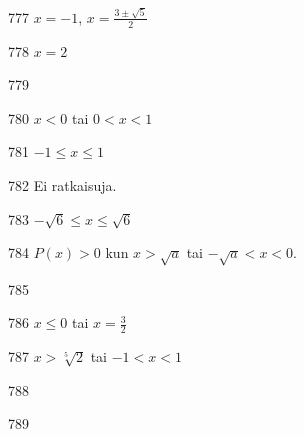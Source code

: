 \begin{Vastaus}{777}
		$x = -1$, $x = \frac{3\pm \sqrt{5}}{2}$
	
\end{Vastaus}
\begin{Vastaus}{778}
	$x=2$
	
\end{Vastaus}
\begin{Vastaus}{779}
    
\end{Vastaus}
\begin{Vastaus}{780}
        $x<0$ tai $0<x<1$
    
\end{Vastaus}
\begin{Vastaus}{781}
        $-1 \le x \le 1$
    
\end{Vastaus}
\begin{Vastaus}{782}
        Ei ratkaisuja.
    
\end{Vastaus}
\begin{Vastaus}{783}
        $-\sqrt{6}\le x \le \sqrt{6}$
    
\end{Vastaus}
\begin{Vastaus}{784}
	$P(x)>0$ kun $x > \sqrt{a}$ tai $-\sqrt{a}<x<0$.
    
\end{Vastaus}
\begin{Vastaus}{785}
    
\end{Vastaus}
\begin{Vastaus}{786}
        $x\le0$ tai $x=\frac{3}{2}$
    
\end{Vastaus}
\begin{Vastaus}{787}
$x > \sqrt[5]{2}$ tai $-1<x<1$
\end{Vastaus}
\begin{Vastaus}{788}
\end{Vastaus}
\begin{Vastaus}{789}
    
\end{Vastaus}
